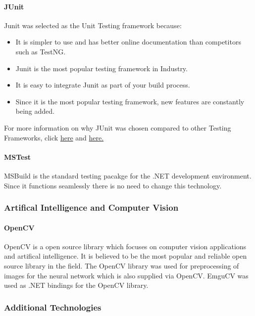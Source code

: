 \documentclass[11pt,a4paper,titlepage]{article}
\begin{document}
			\paragraph{JUnit}
				Junit was selected as the Unit Testing framework because:
					\begin{itemize}	
						\item It is simpler to use and has better online documentation than competitors such as TestNG.
						\item Junit is the most popular testing framework in Industry. 
						\item It is easy to integrate Junit as part of your build process. 
						\item Since it is the most popular testing framework,  new features are constantly  being added.
					\end{itemize}
For more information on why JUnit was chosen compared to other Testing Frameworks, click \href{http://blog.javafortesters.com/2014/09/faq-should-i-use-junit-or-testng-which.html}{here} and
\href{https://seleniumonlinetrainingexpert.wordpress.com/2012/11/21/what-are-advantages-of-testing-with-junit/}{here.} \newline

			\paragraph{MSTest}
				MSBuild is the standard testing pacakge for the .NET development environment. Since it functions seamlessly there is no need to change this technology.
		
	\subsubsection{Artifical Intelligence and Computer Vision}
		\paragraph{OpenCV}
			OpenCV is a open source library which focuses on computer vision applications and artifical intelligence. It is believed to be the most popular and reliable open source library in the field. The OpenCV library was used for preprocessing of images for the neural network which is also supplied via OpenCV. EmguCV was used as .NET bindings for the OpenCV library. 

	\subsubsection{Additional Technologies}
\end{document}
